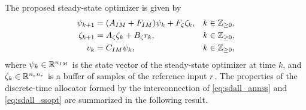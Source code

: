 The proposed steady-state optimizer is given by
\begin{subequations}
  \label{eq:sdall_ssopt}
  \begin{align}
    \psi_{k+1} &= (A_{IM} + F_{IM})\psi_k + F_{\zeta}\zeta_k, & k\in\mathbb{Z}_{\geq 0},\label{eq:sdall_psi}\\
    \zeta_{k+1} &= A_{\zeta}\zeta_k + B_{\zeta}r_k, & k\in\mathbb{Z}_{\geq 0},\\
    v_k &= C_{IM}\psi_k, & k\in\mathbb{Z}_{\geq 0},
  \end{align}
\end{subequations}
where $\psi_k\in\mathbb{R}^{n_{IM}}$ is the state vector of the steady-state optimizer at time $k$, and $\zeta_k\in\mathbb{R}^{{n_e}{n_r}}$ is a buffer of samples of the reference input $r$. The properties of the discrete-time allocator formed by the interconnection of \eqref{eq:sdall_annss} and \eqref{eq:sdall_ssopt} are summarized in the following result.

